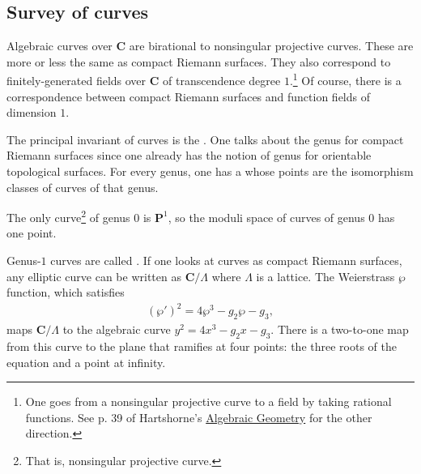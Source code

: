 \documentclass [11 pt, oneside] {article}
\begin{document}
\subsection{Survey of curves}
Algebraic curves over $\mathbf{C}$ are birational to nonsingular projective curves. These are more or less the same as compact Riemann surfaces. They also correspond to finitely-generated fields over $\mathbf{C}$ of transcendence degree $1$.\footnote{One goes from a nonsingular projective curve to a field by taking rational functions. See p. 39 of Hartshorne's \ul{Algebraic Geometry} for the other direction.} Of course, there is a correspondence between compact Riemann surfaces and function fields of dimension $1$.

The principal invariant of curves is the . One talks about the genus for compact Riemann surfaces since one already has the notion of genus for orientable topological surfaces. For every genus, one has a  whose points are the isomorphism classes of curves of that genus.

The only curve\footnote{That is, nonsingular projective curve.} of genus $0$ is $\mathbf{P}^1$, so the moduli space of curves of genus $0$ has one point.

Genus-$1$ curves are called . If one looks at curves as compact Riemann surfaces, any elliptic curve can be written as $\mathbf{C}/\Lambda$ where $\Lambda$ is a lattice. The Weierstrass $\wp$ function, which satisfies
\begin{align*}
	(\wp') ^2 = 4\wp^3 -g_2\wp-g_3,
\end{align*}
maps $\mathbf{C}/\Lambda$ to the algebraic curve $y^2=4x^3-g_2x-g_3$. There is a two-to-one map from this curve to the plane that ramifies at four points: the three roots of the equation and a point at infinity.
\end{document}
